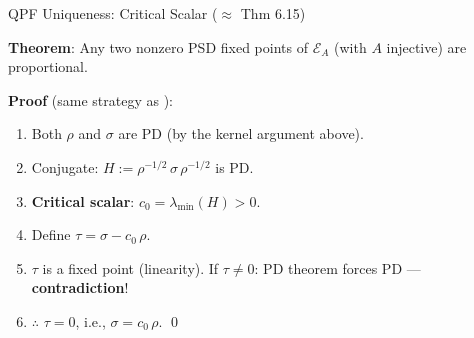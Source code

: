 \documentclass[aspectratio=169,10pt]{beamer}
\begin{document}
\begin{frame}{QPF Uniqueness: Critical Scalar \textnormal{($\approx$ \cite{Wolf2012Quantum} Thm 6.15)}}
    \vspace{-0.5em}

    \textbf{Theorem}: Any two nonzero PSD fixed points of $\mathcal{E}_A$
    (with $A$ injective) are proportional.

    \vspace{0.15em}
    \textbf{\textcolor{leangreen}{Proof}} (same strategy as \cite{Wolf2012Quantum}):
    \begin{enumerate}\itemsep0.08em\small
        \item Both $\rho$ and $\sigma$ are PD (by the kernel argument above).
        \item Conjugate: $H := \rho^{-1/2}\,\sigma\,\rho^{-1/2}$ is PD.
        \item \textbf{Critical scalar}: $c_0 = \lambda_{\min}(H) > 0$.
        \item Define $\tau = \sigma - c_0\,\rho$.
        \item $\tau$ is a fixed point (linearity).
            \quad If $\tau \neq 0$: PD theorem forces PD --- \textbf{contradiction}!
        \item $\therefore$ $\tau = 0$, i.e., $\sigma = c_0\,\rho$. \qed
    \end{enumerate}

    \vspace{0.15em}
    \begin{center}
    \end{center}
\end{frame}
\end{document}
